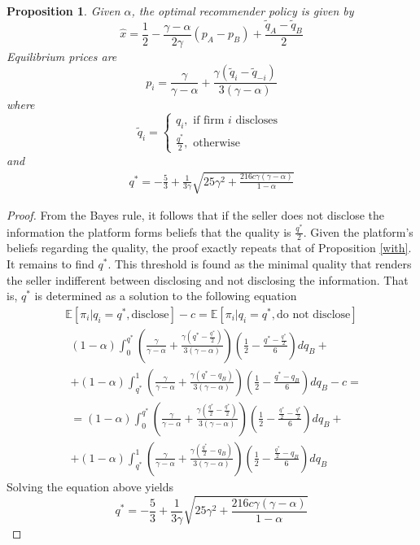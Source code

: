 \documentclass[a4paper]{article}
\newtheorem{proposition}[theorem]{Proposition}
\begin{document}
	\begin{proposition}\label{precise}
		Given $\alpha$, the optimal recommender policy is given by $$\hat{x} = \frac{1}{2} - \frac{\gamma-\alpha}{2 \gamma}(p_A - p_B) + \frac{\tilde{q}_A - \tilde{q}_B}{2}$$
		Equilibrium prices are $$p_i = \frac{\gamma}{\gamma - \alpha} + \frac{\gamma(\tilde{q}_{i} -\tilde{q}_{-i})}{3(\gamma-\alpha)}$$ where $$\tilde{q}_i = \begin{cases}
		q_i, \text{ if firm }i\text{ discloses }\\
		\frac{q^*}{2}, \text{ otherwise}
		\end{cases}$$
		and
		\begin{align}\label{threshold}
		q^* = -\frac{5}{3} + \frac{1}{3 \gamma} \sqrt{25 \gamma^2 + \frac{216 c \gamma (\gamma - \alpha)}{1 - \alpha}}
		\end{align}
	\end{proposition} 
\begin{proof}
From the Bayes rule, it follows that if the seller does not disclose the information the platform forms beliefs that the quality is $\frac{q^*}{2}$. Given the platform's beliefs regarding the quality, the proof exactly repeats that of Proposition \ref{with}. It remains to find $q^*$. This threshold is found as the minimal quality that renders the seller indifferent between disclosing and not disclosing the information. That is, $q^*$ is determined as a solution to the following equation	\begin{align*}
	\mathbb{E} [\pi_i|q_i=q^*, \text{disclose}] - c = \mathbb{E} [\pi_i|q_i=q^*, \text{do not disclose}]
	\end{align*}
	\begin{align*}
	&(1-\alpha)\int_{0}^{q^*} \left(\frac{\gamma}{\gamma - \alpha} + \frac{\gamma\left(q^* - \frac{q^*}{2}\right)}{3(\gamma - \alpha)} \right) \left(\frac{1}{2} - \frac{q^* - \frac{q^*}{2}}{6}\right)dq_B +\\ &+(1-\alpha)\int_{q^*}^{1} \left(\frac{\gamma}{\gamma - \alpha} + \frac{\gamma(q^* - q_B)}{3(\gamma - \alpha)} \right) \left(\frac{1}{2} - \frac{q^* - q_B}{6}\right)dq_B - c = \\
	&=(1-\alpha)\int_{0}^{q^*} \left(\frac{\gamma}{\gamma - \alpha} + \frac{\gamma\left(\frac{q^*}{2} - \frac{q^*}{2}\right)}{3(\gamma - \alpha)} \right) \left(\frac{1}{2} - \frac{\frac{q^*}{2} - \frac{q^*}{2}}{6}\right)dq_B +\\
	&+ (1-\alpha)\int_{q^*}^{1} \left(\frac{\gamma}{\gamma - \alpha} + \frac{\gamma(\frac{q^*}{2} - q_B)}{3(\gamma - \alpha)} \right) \left(\frac{1}{2} - \frac{\frac{q^*}{2} - q_B}{6}\right)dq_B
	\end{align*}
	Solving the equation above yields
	$$q^* = -\frac{5}{3} + \frac{1}{3 \gamma} \sqrt{25 \gamma^2 + \frac{216 c \gamma (\gamma - \alpha)}{1 - \alpha}}$$
\end{proof}
\end{document}
